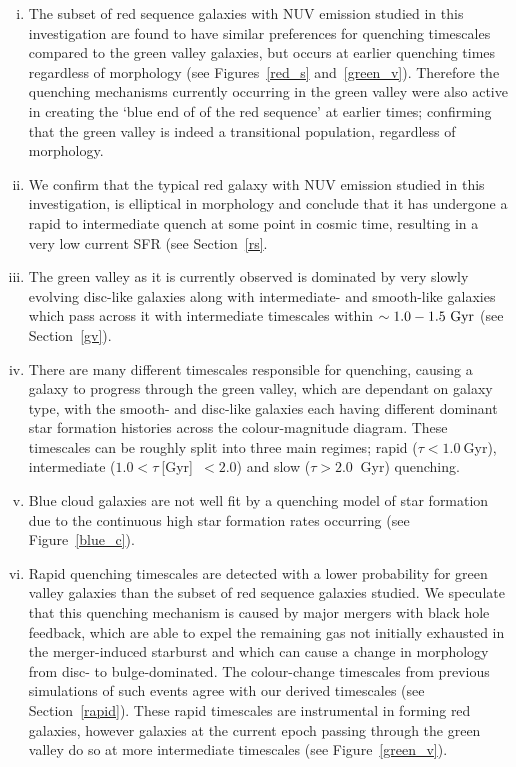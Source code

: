 \begin{enumerate}[(i)]
\item The subset of red sequence galaxies with NUV emission studied in this investigation are found to have similar preferences for quenching timescales compared to the green valley galaxies, but occurs at earlier quenching times regardless of morphology (see Figures~\ref{red_s} and~\ref{green_v}). Therefore the quenching mechanisms currently occurring in the green valley were also active in creating the `blue end of of the red sequence' at earlier times; confirming that the green valley is indeed a transitional population, regardless of morphology.

\item We confirm that the typical red galaxy with NUV emission studied in this investigation, is elliptical in morphology and conclude that it has undergone a rapid to intermediate quench at some point in cosmic time, resulting in a very low current SFR (see Section~\ref{rs}.

\item The green valley as it is currently observed is dominated by very slowly evolving disc-like galaxies along with intermediate- and smooth-like galaxies which pass across it with intermediate timescales within $\sim 1.0-1.5~\rm{Gyr}$ (see Section~\ref{gv}).

\item There are many different timescales responsible for quenching, causing a galaxy to progress through the green valley, which are dependant on galaxy type, with the smooth- and disc-like galaxies each having different dominant star formation histories across the colour-magnitude diagram. These timescales can be roughly split into three main regimes; rapid ($\tau < 1.0~$Gyr), intermediate ($1.0 < \tau~$[Gyr]~$< 2.0$) and slow ($\tau > 2.0~$ Gyr) quenching.

\item Blue cloud galaxies are not well fit by a quenching model of star formation due to the continuous high star formation rates occurring (see Figure~\ref{blue_c}).

\item Rapid quenching timescales are detected with a lower probability for green valley galaxies than the subset of red sequence galaxies studied. We speculate that this quenching mechanism is caused by major mergers with black hole feedback, which are able to expel the remaining gas not initially exhausted in the merger-induced starburst and which can cause a change in morphology from disc- to bulge-dominated. The colour-change timescales from previous simulations of such events agree with our derived timescales (see Section~\ref{rapid}). These rapid timescales are instrumental in forming red galaxies, however galaxies at the current epoch passing through the green valley do so at more intermediate timescales (see Figure~\ref{green_v}).


\end{enumerate}
